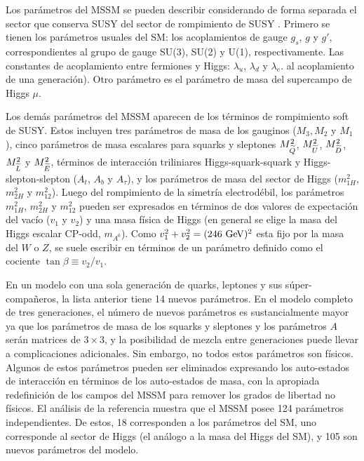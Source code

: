 Los parámetros del MSSM se pueden describir considerando de forma separada el
sector que conserva SUSY del sector de rompimiento de SUSY
\cite{PDG,Haber:1993wf}. Primero se tienen los parámetros usuales del SM: los
acoplamientos de gauge $g_s$, $g$ y $g'$, correspondientes al grupo de gauge
SU(3), SU(2) y U(1), respectivamente. Las constantes de acoplamiento entre
fermiones y Higgs: $\lambda_u$, $\lambda_d$ y $\lambda_e$. %
al acoplamiento de una generación).
Otro parámetro es el parámetro de masa del supercampo de Higgs $\mu$.

Los demás parámetros del MSSM aparecen de los términos de rompimiento soft de
SUSY. Estos incluyen tres parámetros de masa de los gauginos ($M_3, M_2$ y
$M_1$), cinco parámetros de masa escalares para squarks y sleptones
$M^2_{\widetilde{Q}}$, $M^2_{\widetilde{U}}$, $M^2_{\widetilde{D}}$, $M^2_{\widetilde{L}}$ y
$M^2_{\widetilde{E}}$, términos de interacción triliniares Higgs-squark-squark y
Higgs-slepton-slepton ($A_t$, $A_b$ y $A_\tau$), y los parámetros de masa del
sector de Higgs ($m^2_{1H}$, $m^2_{2H}$ y $m^2_{12}$). Luego del rompimiento de
la simetría electrodébil, los parámetros $m^2_{1H}$, $m^2_{2H}$ y $m^2_{12}$
pueden ser expresados en términos de dos valores de expectación del vacío ($v_1$
y $v_2$) y una masa física de Higgs (en general se elige la masa del Higgs
escalar CP-odd, $m_{A^0}$). Como $v_1^2+v_2^2=(246 \gev)^2$ esta fijo por la
masa del $W$ o $Z$, se suele escribir en términos de un parámetro definido como
el cociente $\tan \beta \equiv v_2/v_1$.

En un modelo con una sola generación de quarks, leptones y sus
súper-compa\~neros, la lista anterior tiene 14 nuevos parámetros. En el modelo
completo de tres generaciones, el número de nuevos parámetros es sustancialmente
mayor ya que los parámetros de masa de los squarks y sleptones y los parámetros $A$
serán matrices de $3 \times 3$, y la posibilidad de mezcla entre generaciones
puede llevar a complicaciones adicionales. Sin embargo, no todos estos
parámetros son físicos. Algunos de estos parámetros pueden ser eliminados
expresando los auto-estados de interacción en términos de los auto-estados de
masa, con la apropiada redefinición de los campos del MSSM para remover los
grados de libertad no físicos. El análisis de la referencia
\cite{Dimopoulos:1995ju} muestra que el MSSM posee 124 parámetros
independientes. De estos, 18 corresponden a los parámetros del SM, uno
corresponde al sector de Higgs (el análogo a la masa del Higgs del SM), y 105
son nuevos parámetros del modelo.

